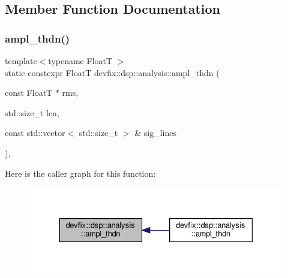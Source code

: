 \subsection{Member Function Documentation}
\mbox{\label{structdevfix_1_1dsp_1_1analysis_ae65db46c95c0f6bd98f9d2f26f7f8c4c}} 
\subsubsection{\texorpdfstring{ampl\+\_\+thdn()}{ampl\_thdn()}\hspace{0.1cm}{\footnotesize\ttfamily [1/2]}}
{\footnotesize\ttfamily template$<$typename FloatT $>$ \\
static constexpr FloatT devfix\+::dsp\+::analysis\+::ampl\+\_\+thdn (\begin{DoxyParamCaption}\item[{const FloatT $\ast$}]{rms,  }\item[{std\+::size\+\_\+t}]{len,  }\item[{const std\+::vector$<$ std\+::size\+\_\+t $>$ \&}]{sig\+\_\+lines }\end{DoxyParamCaption})\hspace{0.3cm}{\ttfamily [inline]}, {\ttfamily [static]}}

Here is the caller graph for this function\+:\nopagebreak
\begin{figure}[H]
\begin{center}
\leavevmode
\includegraphics[width=330pt]{structdevfix_1_1dsp_1_1analysis_ae65db46c95c0f6bd98f9d2f26f7f8c4c_icgraph}
\end{center}
\end{figure}
\mbox{\label{structdevfix_1_1dsp_1_1analysis_a3448d6f6aeaf71facdac78999b3ad177}} 
